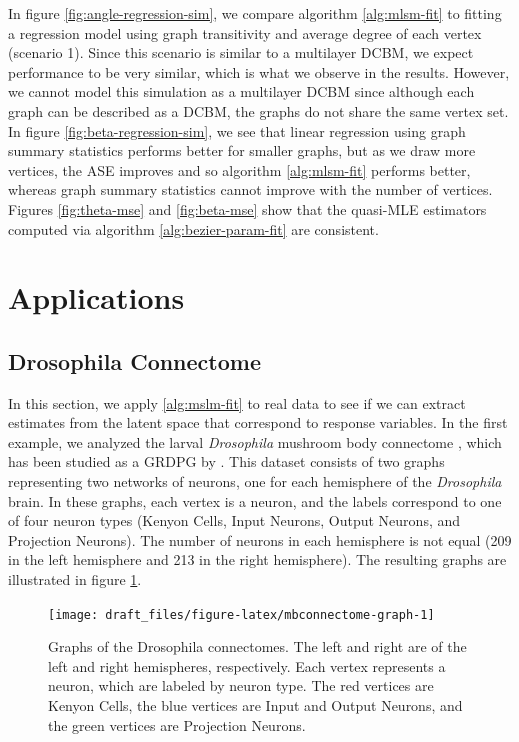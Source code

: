 \documentclass[12pt]{article}
\begin{document}
In figure \ref{fig:angle-regression-sim}, we compare algorithm
\ref{alg:mlsm-fit} to fitting a regression model using graph
transitivity and average degree of each vertex (scenario 1). Since this
scenario is similar to a multilayer DCBM, we expect performance to be
very similar, which is what we observe in the results. However, we
cannot model this simulation as a multilayer DCBM since although each
graph can be described as a DCBM, the graphs do not share the same
vertex set. In figure \ref{fig:beta-regression-sim}, we see that linear
regression using graph summary statistics performs better for smaller
graphs, but as we draw more vertices, the ASE improves and so algorithm
\ref{alg:mlsm-fit} performs better, whereas graph summary statistics
cannot improve with the number of vertices. Figures \ref{fig:theta-mse}
and \ref{fig:beta-mse} show that the quasi-MLE estimators computed via
algorithm \ref{alg:bezier-param-fit} are consistent.

\section{Applications}\label{applications}

\subsection{Drosophila Connectome}\label{drosophila-connectome}

In this section, we apply \ref{alg:mslm-fit} to real data to see if we
can extract estimates from the latent space that correspond to response
variables. In the first example, we analyzed the larval
\emph{Drosophila} mushroom body connectome \citep{Eichler141762}, which
has been studied as a GRDPG by \citet{athreya2020estimation}. This
dataset consists of two graphs representing two networks of neurons, one
for each hemisphere of the \emph{Drosophila} brain. In these graphs,
each vertex is a neuron, and the labels correspond to one of four neuron
types (Kenyon Cells, Input Neurons, Output Neurons, and Projection
Neurons). The number of neurons in each hemisphere is not equal (209 in
the left hemisphere and 213 in the right hemisphere). The resulting
graphs are illustrated in figure \ref{fig:mbconnectome-graph}.

\begin{figure}[H]

{\centering \texttt{[image: draft\_files/figure-latex/mbconnectome-graph-1]} 

}

\caption{Graphs of the Drosophila connectomes. The left and right are of the left and right hemispheres, respectively. Each vertex represents a neuron, which are labeled by neuron type. The red vertices are Kenyon Cells, the blue vertices are Input and Output Neurons, and the green vertices are Projection Neurons.}\label{fig:mbconnectome-graph}
\end{figure}
\end{document}
